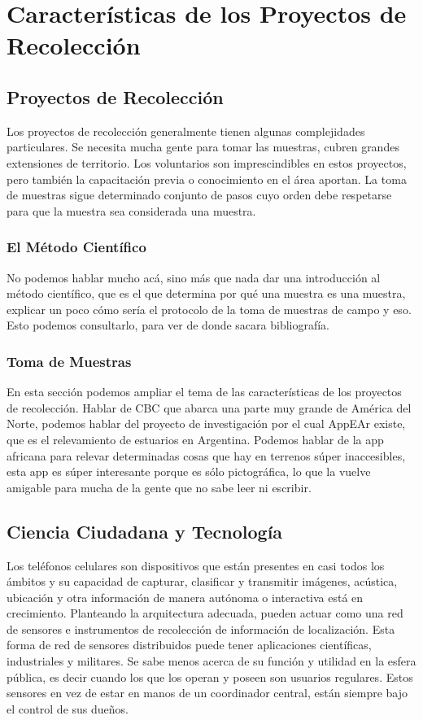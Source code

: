 \chapter{Características de los Proyectos de Recolección}

\section{Proyectos de Recolección}
Los proyectos de recolección generalmente tienen algunas complejidades particulares. Se necesita mucha gente para tomar las muestras, cubren grandes extensiones de territorio. Los voluntarios son imprescindibles en estos proyectos, pero también la capacitación previa o conocimiento en el área aportan. La toma de muestras sigue determinado conjunto de pasos cuyo orden debe respetarse para que la muestra sea considerada una muestra. 

\subsection{El Método Científico}
No podemos hablar mucho acá, sino más que nada dar una introducción al método científico, que es el que determina por qué una muestra es una muestra, explicar un poco cómo sería el protocolo de la toma de muestras de campo y eso. Esto podemos consultarlo, para ver de donde sacara bibliografía.

\subsection{Toma de Muestras}	
En esta sección podemos ampliar el tema de las características de los proyectos de recolección. Hablar de CBC que abarca una parte muy grande de América del Norte, podemos hablar del proyecto de investigación por el cual AppEAr existe, que es el relevamiento de estuarios en Argentina. Podemos hablar de la app africana para relevar determinadas cosas que hay en terrenos súper inaccesibles, esta app es súper interesante porque es sólo pictográfica, lo que la vuelve amigable para mucha de la gente que no sabe leer ni escribir. 

\section{Ciencia Ciudadana y Tecnología}

	Los teléfonos celulares son dispositivos que están presentes en casi todos los ámbitos y su capacidad de capturar, clasificar y transmitir imágenes, acústica, ubicación y otra información de manera autónoma o interactiva está en crecimiento.
Planteando la arquitectura adecuada, pueden actuar como una red de sensores e instrumentos de recolección de información de localización. 
Esta forma de red de sensores distribuidos puede tener aplicaciones científicas, industriales y militares. Se sabe menos acerca de su función y utilidad en la esfera pública, es decir cuando los que los operan y poseen son usuarios regulares.   Estos sensores en vez de estar en manos de un coordinador central, están siempre bajo el control de sus dueños.

